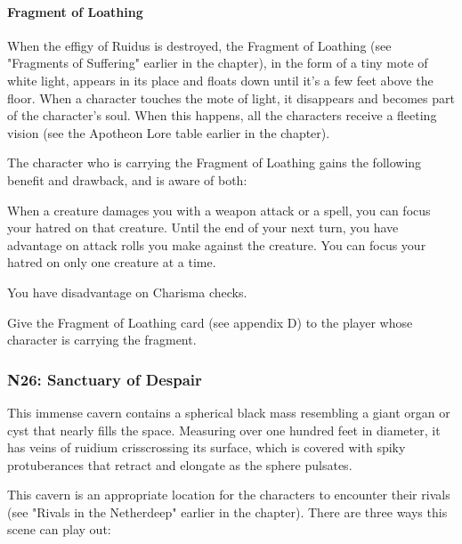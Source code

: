 \documentclass[10pt,a4paper,twoside,bg=print,twocolumn,openany,nodeprecatedcode]{dndbook}
\begin{document}
\paragraph{Fragment of Loathing}
When the effigy of Ruidus is destroyed, the Fragment of Loathing (see "Fragments of Suffering" earlier in the chapter), in the form of a tiny mote of white light, appears in its place and floats down until it's a few feet above the floor. When a character touches the mote of light, it disappears and becomes part of the character's soul. When this happens, all the characters receive a fleeting vision (see the Apotheon Lore table earlier in the chapter).

The character who is carrying the Fragment of Loathing gains the following benefit and drawback, and is aware of both:

\begin{DndComment}{}

\begin{description}[nolistsep]
\item[Benefit.]
When a creature damages you with a weapon attack or a spell, you can focus your hatred on that creature. Until the end of your next turn, you have advantage on attack rolls you make against the creature. You can focus your hatred on only one creature at a time.
\item[Drawback.]
You have disadvantage on Charisma checks.
\end{description}

\end{DndComment}

Give the Fragment of Loathing card (see appendix D) to the player whose character is carrying the fragment.

\subsubsection{N26: Sanctuary of Despair}
\begin{DndReadAloud}{}
This immense cavern contains a spherical black mass resembling a giant organ or cyst that nearly fills the space. Measuring over one hundred feet in diameter, it has veins of ruidium crisscrossing its surface, which is covered with spiky protuberances that retract and elongate as the sphere pulsates.

\end{DndReadAloud}

This cavern is an appropriate location for the characters to encounter their rivals (see "Rivals in the Netherdeep" earlier in the chapter). There are three ways this scene can play out:
\end{document}
